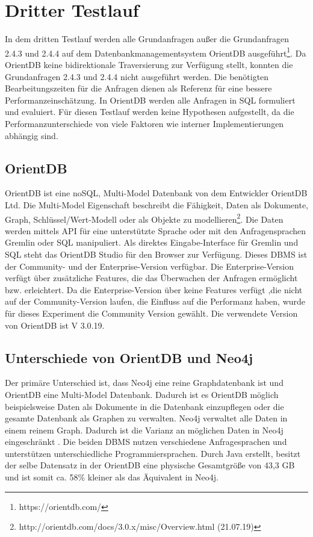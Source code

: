 \section{Dritter Testlauf}
In dem dritten Testlauf werden alle Grundanfragen außer die Grundanfragen 2.4.3 und 2.4.4 auf dem Datenbankmanagementsystem OrientDB ausgeführt\footnote{https://orientdb.com/}. Da OrientDB keine bidirektionale Traversierung zur Verfügung stellt, konnten die Grundanfragen 2.4.3 und 2.4.4 nicht ausgeführt werden. Die benötigten Bearbeitungszeiten für die Anfragen dienen als Referenz für eine bessere Performanzeinschätzung. In OrientDB werden alle Anfragen in SQL formuliert und evaluiert. Für diesen Testlauf werden keine Hypothesen aufgestellt, da die Performanzunterschiede von viele Faktoren wie interner Implementierungen abhängig sind. 
\subsection{OrientDB}
OrientDB ist eine noSQL,  Multi-Model Datenbank von dem Entwickler OrientDB Ltd. Die Multi-Model Eigenschaft beschreibt die Fähigkeit, Daten als Dokumente, Graph, Schlüssel/Wert-Modell oder als Objekte zu modellieren\footnote{http://orientdb.com/docs/3.0.x/misc/Overview.html (21.07.19)}. Die Daten werden mittels API für eine unterstützte Sprache oder mit den Anfragensprachen Gremlin oder SQL manipuliert. Als direktes Eingabe-Interface für Gremlin und SQL steht das OrientDB Studio für den Browser zur Verfügung.  Dieses DBMS ist der Community- und der Enterprise-Version verfügbar. Die Enterprise-Version verfügt über zusätzliche Features, die das Überwachen der Anfragen ermöglicht bzw. erleichtert. Da die Enterprise-Version über keine Features verfügt ,die nicht auf der Community-Version laufen, die Einfluss auf die  Performanz haben, wurde für dieses Experiment die Community Version gewählt. Die verwendete Version von OrientDB ist V 3.0.19. 
\subsection{Unterschiede von OrientDB und Neo4j}
Der primäre Unterschied ist, dass Neo4j eine reine Graphdatenbank ist und OrientDB eine Multi-Model Datenbank. Dadurch ist es OrientDB möglich beispielsweise Daten als Dokumente in die Datenbank einzupflegen oder die gesamte Datenbank als Graphen zu verwalten. Neo4j verwaltet alle Daten in einem reinem Graph. Dadurch ist  die Varianz an möglichen Daten in Neo4j eingeschränkt \parencite{fernandes2018graph}. Die beiden DBMS nutzen verschiedene Anfragesprachen und unterstützen unterschiedliche Programmiersprachen. Durch Java erstellt, besitzt der selbe Datensatz in der OrientDB eine physische Gesamtgröße von 43,3 GB und ist somit ca. 58\% kleiner als das Äquivalent in Neo4j.
